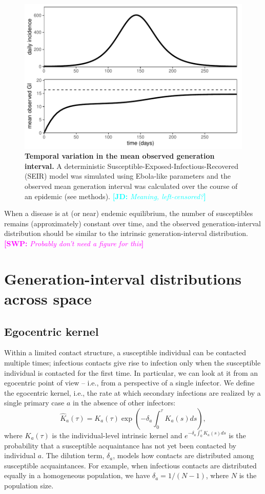 \documentclass[12pt]{article}
\newcommand{\comment}[3]{\textcolor{#1}{\textbf{[#2: }\textsl{#3}\textbf{]}}}
\newcommand{\jd}[1]{\comment{cyan}{JD}{#1}}
\newcommand{\swp}[1]{\comment{magenta}{SWP}{#1}}
\begin{document}
\begin{figure}
\includegraphics[width=\textwidth]{../fig/temporal_effect.pdf}
\caption{\textbf{Temporal variation in the mean observed generation interval.}
A deterministic Susceptible-Exposed-Infectious-Recovered (SEIR) model was simulated using Ebola-like parameters and the observed mean generation interval was calculated over the course of an epidemic (see methods).
\jd{Meaning, left-censored?}
}
\label{fig:censor}
\end{figure}

When a disease is at (or near) endemic equilibrium, the number of susceptibles remains (approximately) constant over time, and the observed generation-interval distribution should be similar to the intrinsic generation-interval distribution.
\swp{Probably don't need a figure for this}

\section{Generation-interval distributions across space}

\subsection{Egocentric kernel}

Within a limited contact structure, a susceptible individual can be contacted multiple times;
infectious contacts give rise to infection only when the susceptible individual is contacted for the first time.
In particular, we can look at it from an egocentric point of view -- i.e., from a perspective of a single infector.
We define the egocentric kernel, i.e., the rate at which secondary infections are realized by a single primary case $a$ in the absence of other infectors:
\begin{equation}
\hat{K}_a(\tau) = K_a(\tau) \exp \left(- \delta_a \int_0^\tau K_a(s) ds\right),
\end{equation}
where $K_a(\tau)$ is the individual-level intrinsic kernel and $e^{- \delta_a \int_0^\tau K_a(s) ds}$ is the probability that a susceptible acquaintance has not yet been contacted by individual $a$.
The dilution term, $\delta_a$, models how contacts are distributed among susceptible acquaintances.
For example, when infectious contacts are distributed equally in a homogeneous population, we have $\delta_a = 1/(N-1)$, where $N$ is the population size.
\end{document}
